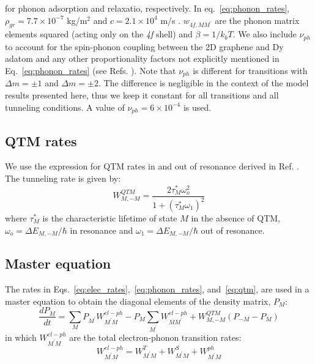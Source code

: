 \documentclass[reprint,amsmath,amssymb,aps,nofootinbib,onecolumn]{revtex4-2}
\begin{document}
\noindent
for phonon adsorption and relaxatio, respectively. In eq.~\ref{eq:phonon_rates}, $\rho_{gr} = 7.7 \times 10^{-7}$ kg/m$^2$ and $c = 2.1 \times 10^4$ m/s \cite{Falkovsky2007}. $w_{4f,MM^{\prime}}$ are the phonon matrix elements squared (acting only on the \textit{4f} shell) and $\beta = 1/ k_{b} T$. We also include $\nu_{ph}$ to account for the spin-phonon coupling between the 2D graphene and Dy adatom and any other proportionality factors not explicitly mentioned in Eq.~\ref{eq:phonon_rates} (see Refs. \cite{Leuenberger2000,cervetti2016}). Note that $\nu_{ph}$ is different for transitions with $\Delta m = \pm 1$ and $\Delta m = \pm 2$. The difference is negligible in the context of the model results presented here, thus we keep it constant for all transitions and all tunneling conditions. A value of $\nu_{ph} = 6 \times 10^{-4}$ is used. \par

\subsection{QTM rates}
We use the expression for QTM rates in and out of resonance derived in Ref. \cite{abragam1961,fort1998}. The tunneling rate is given by:
\begin{equation}
W^{QTM}_{M,-M} =  \frac{2 \tau^{*}_{M} \omega^{2}_{o}}{1 + (\tau^{*}_{M} \omega_{1})^2}
\label{eq:qtm}
\end{equation}
where $\tau^{*}_{M}$ is the characteristic lifetime of state $M$ in the absence of QTM, $\omega_{o} = \Delta E_{M,-M}/\hbar$ in resonance and $\omega_{1} = \Delta E_{M,-M}/\hbar$ out of resonance. 

\subsection{Master equation}

The rates in Eqs.~\ref{eq:elec_rates},~\ref{eq:phonon_rates}, and~\ref{eq:qtm}, are used in a master equation to obtain the diagonal elements of the density matrix, $P_M$:
\begin{equation}
    \dfrac{dP_M}{dt}=\sum_M P_{M^{\prime}}W^{el-ph}_{M^{\prime}M} - P_M\sum_{M^{\prime}}W^{el-ph}_{MM^{\prime}}+W^{QTM}_{M,-M}(P_{-M}- P_{M})
    \label{eq:master}
\end{equation}
in which $W^{el-ph}_{M^{\prime}M}$ are the total electron-phonon transition rates:
\begin{equation}
    W^{el-ph}_{M^{\prime}M}=W^{T}_{M^{\prime}M}+W^{S}_{M^{\prime}M}+W^{ph}_{M^{\prime}M}
\end{equation}
\end{document}
